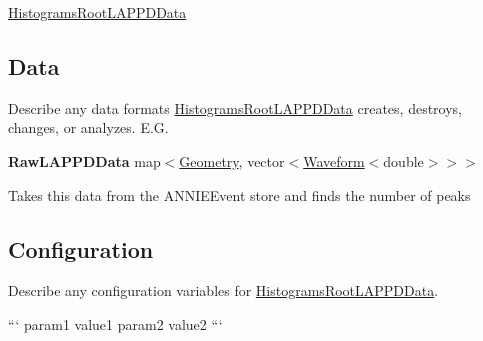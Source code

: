 \hyperlink{classHistogramsRootLAPPDData}{Histograms\-Root\-L\-A\-P\-P\-D\-Data}

\subsection*{Data}

Describe any data formats \hyperlink{classHistogramsRootLAPPDData}{Histograms\-Root\-L\-A\-P\-P\-D\-Data} creates, destroys, changes, or analyzes. E.\-G.

{\bfseries Raw\-L\-A\-P\-P\-D\-Data} {\ttfamily map$<$\hyperlink{classGeometry}{Geometry}, vector$<$\hyperlink{classWaveform}{Waveform}$<$double$>$$>$$>$}
\begin{DoxyItemize}
\item Takes this data from the {\ttfamily A\-N\-N\-I\-E\-Event} store and finds the number of peaks
\end{DoxyItemize}

\subsection*{Configuration}

Describe any configuration variables for \hyperlink{classHistogramsRootLAPPDData}{Histograms\-Root\-L\-A\-P\-P\-D\-Data}.

``` param1 value1 param2 value2 ``` 